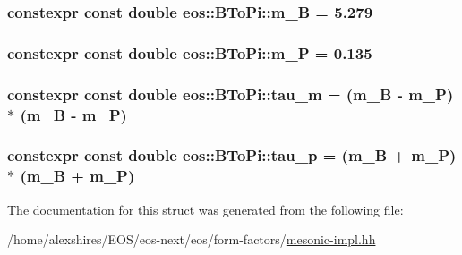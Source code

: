 \label{structeos_1_1BToPi_a4e334a932389c4f346a1d7d685e3f6cc}
\hypertarget{structeos_1_1BToPi_a368ef58c6e0296a92246459961bb1898}{
\subsubsection[{m\_\-B}]{\setlength{\rightskip}{0pt plus 5cm}constexpr const double {\bf eos::BToPi::m\_\-B} = 5.279}}
\label{structeos_1_1BToPi_a368ef58c6e0296a92246459961bb1898}
\hypertarget{structeos_1_1BToPi_a3ae475ef38ac384d05ace3e6e4f8c4e1}{
\subsubsection[{m\_\-P}]{\setlength{\rightskip}{0pt plus 5cm}constexpr const double {\bf eos::BToPi::m\_\-P} = 0.135}}
\label{structeos_1_1BToPi_a3ae475ef38ac384d05ace3e6e4f8c4e1}
\hypertarget{structeos_1_1BToPi_ac77ffd0ef98e06372594d0eba51118e6}{
\subsubsection[{tau\_\-m}]{\setlength{\rightskip}{0pt plus 5cm}constexpr const double {\bf eos::BToPi::tau\_\-m} = ({\bf m\_\-B} -\/ {\bf m\_\-P}) $\ast$ ({\bf m\_\-B} -\/ {\bf m\_\-P})}}
\label{structeos_1_1BToPi_ac77ffd0ef98e06372594d0eba51118e6}
\hypertarget{structeos_1_1BToPi_a1fd711c0a854118ef42495b16d2b0419}{
\subsubsection[{tau\_\-p}]{\setlength{\rightskip}{0pt plus 5cm}constexpr const double {\bf eos::BToPi::tau\_\-p} = ({\bf m\_\-B} + {\bf m\_\-P}) $\ast$ ({\bf m\_\-B} + {\bf m\_\-P})}}
\label{structeos_1_1BToPi_a1fd711c0a854118ef42495b16d2b0419}


The documentation for this struct was generated from the following file:\begin{DoxyCompactItemize}
\item 
/home/alexshires/EOS/eos-\/next/eos/form-\/factors/\hyperlink{mesonic-impl_8hh}{mesonic-\/impl.hh}\end{DoxyCompactItemize}
